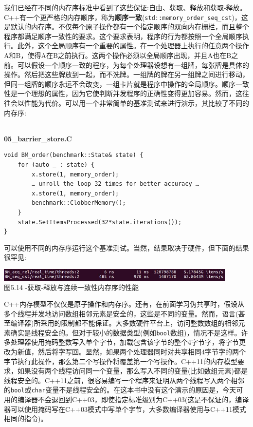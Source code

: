 我们已经在不同的内存序标准中看到了这些保证:自由、获取、释放和获取-释放。C++有一个更严格的内存顺序，称为\textbf{顺序一致}(\texttt{std::memory\_order\_seq\_cst})，这是默认的内存序。不仅每个原子操作都有一个指定顺序的双向内存栅栏，而且整个程序都满足顺序一致性的要求。这个要求表明，程序的行为都按照一个全局顺序执行。此外，这个全局顺序有一个重要的属性。在一个处理器上执行的任意两个操作A和B，使得A在B之前执行。这两个操作必须以全局顺序出现，并且A也在B之前。可以假设一个顺序一致的程序，为每个处理器设想有一组牌，每张牌是具体的操作。然后把这些牌放到一起，而不洗牌。一组牌的牌在另一组牌之间进行移动，但同一组牌的顺序永远不会改变，一组卡片就是程序中操作的全局顺序。顺序一致性是一个理想的属性，因为它使判断并发程序的正确性变得更加容易。然而，这往往会以性能为代价。可以用一个非常简单的基准测试来进行演示，其比较了不同的内存序:

\hspace*{\fill} \\ %
\noindent
\textbf{05\_barrier\_store.C}
\begin{lstlisting}[style=styleCXX]
void BM_order(benchmark::State& state) {
	for (auto _ : state) {
		x.store(1, memory_order);
		… unroll the loop 32 times for better accuracy …
		x.store(1, memory_order);
		benchmark::ClobberMemory();
	}
	state.SetItemsProcessed(32*state.iterations());
}
\end{lstlisting}

可以使用不同的内存序运行这个基准测试。当然，结果取决于硬件，但下面的结果很罕见:

\begin{center}
\includegraphics[width=0.9\textwidth]{content/1/chapter5/images/14.jpg}\\
图5.14 -获取-释放与连续一致性内存序的性能
\end{center}

C++内存模型不仅仅是原子操作和内存序。还有，在前面学习伪共享时，假设从多个线程并发地访问数组相邻元素是安全的，这些是不同的变量。然而，语言(甚至编译器)所采用的限制都不能保证。大多数硬件平台上，访问整数数组的相邻元素确实是线程安全的。但对于较小的数据类型(例如\texttt{bool}数组)，情况不是这样。许多处理器使用掩码整数写入单个字节，加载包含该字节的整个4字节字，将字节更改为新值，然后将字写回。显然，如果两个处理器同时对共享相同4字节字的两个字节执行此操作，那么第二个写操作将覆盖第一个写操作。C++11的内存模型要求，如果没有两个线程访问同一个变量，那么写入不同的变量(比如数组元素)都是线程安全的。C++11之前，很容易编写一个程序来证明从两个线程写入两个相邻的\texttt{bool}或\texttt{char}变量不是线程安全的。在这本书中没有这个演示的原因是，今天可用的编译器不会退回到C++03，即使指定标准级别为C++03(这是不保证的，编译器可以使用掩码写在C++03模式中写单个字节，大多数编译器使用与C++11模式相同的指令)。

